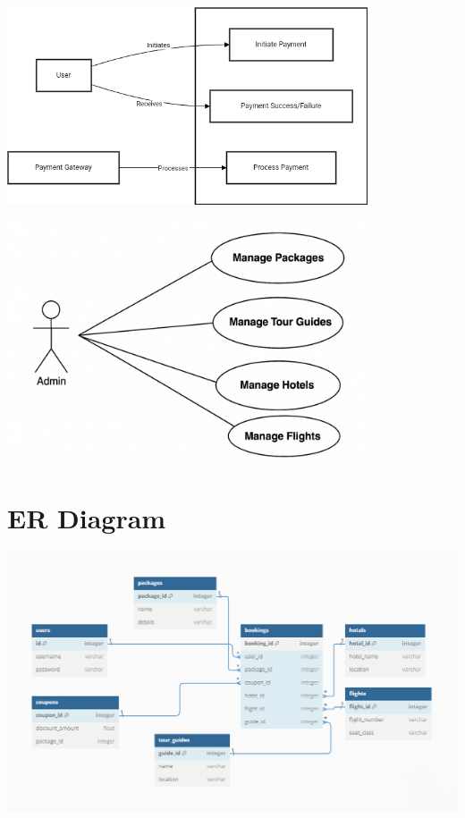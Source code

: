 \vspace{0.5cm}
\begin{center}
\includegraphics[width=0.8\textwidth]{./figures/Use Case Diagrams/3_usecase.png} %
\end{center}
\vspace{0.5cm}

\vspace{0.5cm}
\begin{center}
\includegraphics[width=0.8\textwidth]{./figures/Use Case Diagrams/4_crud_usecase.png} %
\end{center}
\vspace{0.5cm}
\section{ER Diagram}
\vspace{0.5cm}
\begin{center}
\includegraphics[width=1.0\textwidth]{./figures/ER Diagram/erd.png} %
\end{center}
